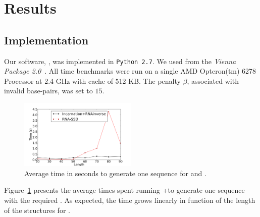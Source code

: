\section{Results}
\label{sec:results}

\subsection{Implementation}
\label{sec:implementation}
Our software, \ourprog, was implemented in {\tt Python~2.7}. We used
\RNAinverse from the \textit{Vienna Package 2.0}~\citep{Hofacker:1994}.
All time benchmarks were run on a single AMD Opteron(tm) 6278 Processor  at 2.4 GHz with cache of 512 KB.
The penalty $\beta$, associated with invalid base-pairs, was set to $15$.

\begin{figure}[ht!]
	\centering
 	\includegraphics[width=0.5\textwidth]{Figures/time_incar_rnassd}
	\caption{
  Average time in seconds to generate one sequence for \ourprog and \RNAinverse.}
	\label{fig:time}	
\end{figure}

Figure~\ref{fig:time} presents the average times spent running \ourprog+\RNAinverse to generate one sequence
with the required \GCContent. As expected, the time grows linearly
in function of the length of the structures for \ourprog.  



